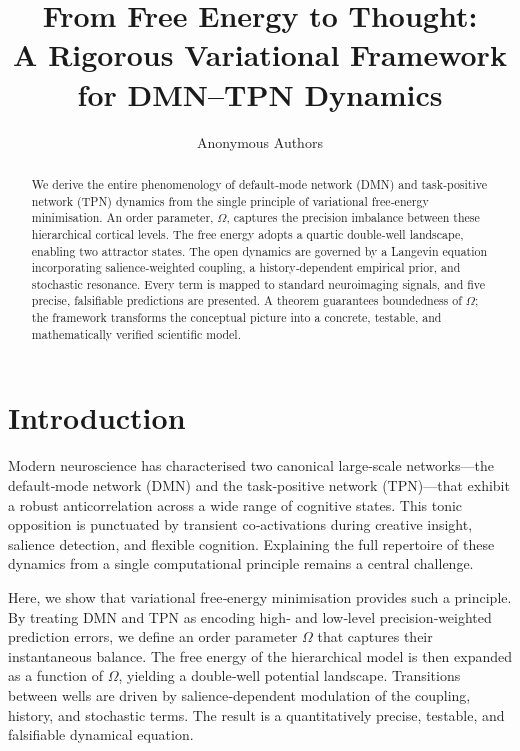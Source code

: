 \documentclass[11pt]{article}
\title{\textbf{From Free Energy to Thought:\\
A Rigorous Variational Framework for DMN--TPN Dynamics}}
\author{Anonymous Authors}
\begin{document}
\maketitle

\begin{abstract}
We derive the entire phenomenology of default‑mode network (DMN) and task‑positive network (TPN) dynamics from the single principle of variational free‑energy minimisation. An order parameter, $\Omega$, captures the precision imbalance between these hierarchical cortical levels. The free energy adopts a quartic double‑well landscape, enabling two attractor states. The open dynamics are governed by a Langevin equation incorporating salience‑weighted coupling, a history‑dependent empirical prior, and stochastic resonance. Every term is mapped to standard neuroimaging signals, and five precise, falsifiable predictions are presented. A theorem guarantees boundedness of $\Omega$; the framework transforms the conceptual picture into a concrete, testable, and mathematically verified scientific model.
\end{abstract}

\section{Introduction}
Modern neuroscience has characterised two canonical large‑scale networks---the default‑mode network (DMN) and the task‑positive network (TPN)---that exhibit a robust anticorrelation across a wide range of cognitive states. This tonic opposition is punctuated by transient co‑activations during creative insight, salience detection, and flexible cognition. Explaining the full repertoire of these dynamics from a single computational principle remains a central challenge.

Here, we show that variational free‑energy minimisation \cite{friston2010free} provides such a principle. By treating DMN and TPN as encoding high‑ and low‑level precision‑weighted prediction errors, we define an order parameter $\Omega$ that captures their instantaneous balance. The free energy of the hierarchical model is then expanded as a function of $\Omega$, yielding a double‑well potential landscape. Transitions between wells are driven by salience‑dependent modulation of the coupling, history, and stochastic terms. The result is a quantitatively precise, testable, and falsifiable dynamical equation.
\end{document}

